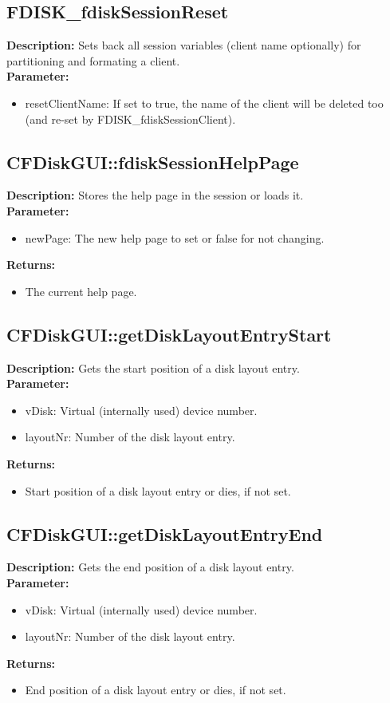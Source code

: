 \subsection{FDISK\_fdiskSessionReset}
\textbf{Description:} Sets back all session variables (client name optionally) for partitioning and formating a client.\\
\textbf{Parameter:}
\begin{itemize}
\item resetClientName: If set to true, the name of the client will be deleted too (and re-set by FDISK\_fdiskSessionClient).
\end{itemize}

\subsection{CFDiskGUI::fdiskSessionHelpPage}
\textbf{Description:} Stores the help page in the session or loads it.\\
\textbf{Parameter:}
\begin{itemize}
\item newPage: The new help page to set or false for not changing.
\end{itemize}
\textbf{Returns:}
\begin{itemize}
\item The current help page.
\end{itemize}

\subsection{CFDiskGUI::getDiskLayoutEntryStart}
\textbf{Description:} Gets the start position of a disk layout entry.\\
\textbf{Parameter:}
\begin{itemize}
\item vDisk: Virtual (internally used) device number.
\item layoutNr: Number of the disk layout entry.
\end{itemize}
\textbf{Returns:}
\begin{itemize}
\item Start position of a disk layout entry or dies, if not set.
\end{itemize}

\subsection{CFDiskGUI::getDiskLayoutEntryEnd}
\textbf{Description:} Gets the end position of a disk layout entry.\\
\textbf{Parameter:}
\begin{itemize}
\item vDisk: Virtual (internally used) device number.
\item layoutNr: Number of the disk layout entry.
\end{itemize}
\textbf{Returns:}
\begin{itemize}
\item End position of a disk layout entry or dies, if not set.
\end{itemize}

